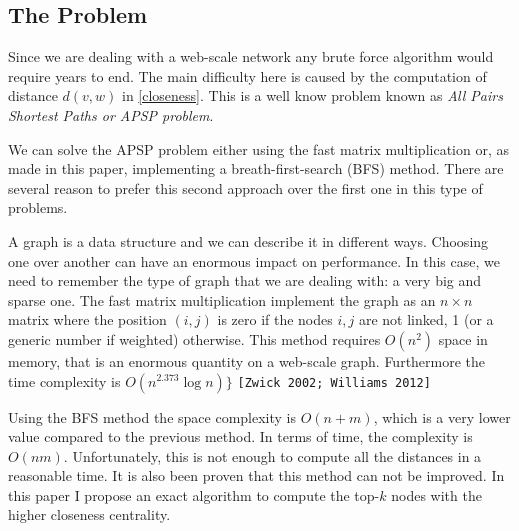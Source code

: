 \subsection{The Problem}

Since we are dealing with a web-scale network any brute force algorithm would require years to end. The main difficulty here is caused by the computation of distance $d(v,w)$ in \eqref{closeness}. This is a well know problem known as \emph{All Pairs Shortest Paths or APSP problem}. \s

\noindent We can solve the APSP problem either using the fast matrix multiplication or, as made in this paper, implementing a breath-first-search (BFS) method. There are several reason to prefer this second approach over the first one in this type of problems. \s

\noindent A graph is a data structure and we can describe it in different ways. Choosing one over another can have an enormous impact on performance. In this case, we need to remember the type of graph that we are dealing with: a very big and sparse one. The fast matrix multiplication implement the graph as an $n\times n$ matrix where the position $(i,j)$ is zero if the nodes $i,j$ are not linked, 1 (or a generic number if weighted) otherwise. This method requires $O(n^2)$ space in memory, that is an enormous quantity on a web-scale graph. Furthermore the time complexity is $O(n^{2.373} \log n)\}$ \texttt{[Zwick 2002; Williams 2012]}  \s

\noindent Using the BFS method the space complexity is $O(n+m)$, which is a very lower value compared to the previous method. In terms of time, the complexity is $O(nm)$. Unfortunately, this is not enough to compute all the distances in a reasonable time. It is also been proven that this method can not be improved. In this paper I propose an exact algorithm to compute the top-$k$ nodes with the higher closeness centrality.
